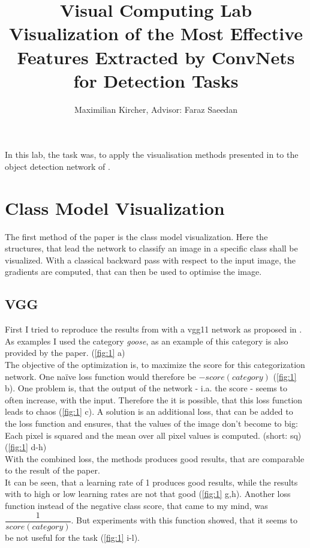 \documentclass[a4paper, 10pt, deutsch]{llncs}
\begin{document}
\title{{\normalsize Visual Computing Lab} \\
  Visualization of the Most Effective Features Extracted by ConvNets for Detection Tasks}
\author{Maximilian Kircher, Advisor: Faraz Saeedan}

\maketitle

In this lab, the task was, to apply the visualisation methods presented in \cite{simonyan2013deep} to the object detection network of \cite{liu2016ssd}.

\section{Class Model Visualization}

The first method of the paper is the class model visualization. Here the structures, that lead the network to classify an image in a specific class shall be visualized. With a classical backward pass with respect to the input image, the gradients are computed, that can then be used to optimise the image.

\subsection{VGG}

First I tried to reproduce the results from \cite{simonyan2013deep} with a vgg11 network as proposed in \cite{simonyan2014very}. As examples I used the category \textit{goose}, as an example of this category is also provided by the paper. (\ref{fig:1} a)\\
The objective of the optimization is, to maximize the score for this categorization network. One na\"ive loss function would therefore be $-score(category)$ (\ref{fig:1} b). One problem is, that the output of the network - i.a. the score - seems to often increase, with the input. Therefore the it is possible, that this loss function leads to chaos (\ref{fig:1} c).
A solution is an additional loss, that can be added to the loss function and ensures, that the values of the image don't become to big: Each pixel is squared and the mean over all pixel values is computed. (short: sq) (\ref{fig:1} d-h)\\
With the combined loss, the methods produces good results, that are comparable to the result of the paper.\\
It can be seen, that a learning rate of 1 produces good results, while the results with to high or low learning rates are not that good (\ref{fig:1} g,h).
Another loss function instead of the negative class score, that came to my mind, was $\dfrac{1}{score(category)}$.
But experiments with this function showed, that it seems to be not useful for the task (\ref{fig:1} i-l).
\end{document}
